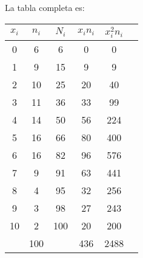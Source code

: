 \documentclass[11pt,a4paper]{article}
\theoremstyle{definition}
\begin{document}
La tabla completa es:

\begin{table}[!htbp]
\hspace*{1 cm}
\begin{tabular}{|c|c|c|c|c|c|}
$x_i$ & $n_i$ & $N_i$ & $x_in_i$ & $x_i^2n_i$\\ \hline
0 & 6 & 6 & 0 & 0 \\
1 & 9 & 15 & 9 & 9 \\
2 & 10 & 25 & 20 & 40 \\
3 & 11 & 36 & 33 & 99 \\
4 & 14 & 50 & 56 & 224 \\
5 & 16 & 66 & 80 & 400 \\
6 & 16 & 82 & 96 & 576 \\
7 & 9 & 91 & 63 & 441 \\
8 & 4 & 95 & 32 & 256 \\
9 & 3 & 98 & 27 & 243 \\
10 & 2 & 100 & 20 & 200 \\ \hline
\multicolumn{1}{c}{} & \multicolumn{1}{|c|}{100} & \multicolumn{1}{c}{} & \multicolumn{1}{|c|}{436} & \multicolumn{1}{|c|}{2488} \\ \cline{2-2} \cline{4-5}
\end{tabular}
\end{table}
\end{document}
